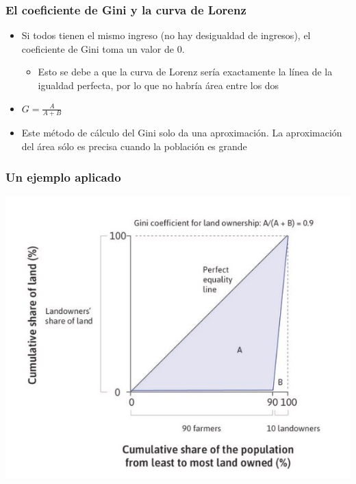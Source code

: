 \documentclass{beamer}
\begin{document}
\begin{frame} 
\frametitle{El coeficiente de Gini y la curva de Lorenz}
\begin{itemize}
\item Si todos tienen el mismo ingreso (no hay desigualdad de ingresos), el coeficiente de Gini toma un valor de 0. 
\begin{itemize}
    \item Esto se debe a que la curva de Lorenz sería exactamente la línea de la igualdad perfecta, por lo que no habría área entre los dos
\end{itemize}
\item $G=\frac{A}{A+B}$
\item Este método de cálculo del Gini solo da una aproximación. La aproximación del área sólo es precisa cuando la población es grande
\end{itemize}
\end{frame}

\begin{frame} 
\frametitle{Un ejemplo aplicado}
    \begin{center}    
    \includegraphics[scale=0.55]{../Tema_04.18_lorenz3.jpg}
    \end{center}
\end{frame}
\end{document}
